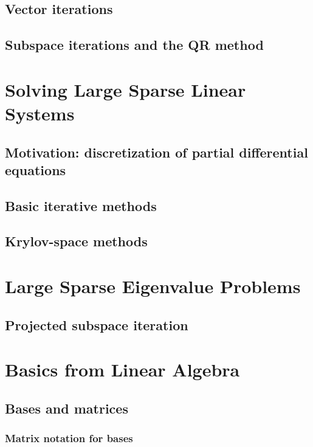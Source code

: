 \section{Vector iterations}


\section{Subspace iterations and the QR method}


%

\chapter{Solving Large Sparse Linear Systems}

\section{Motivation: discretization of partial differential equations}



\section{Basic iterative methods}


\section{Krylov-space methods}


\chapter{Large Sparse Eigenvalue Problems}
\section{Projected subspace iteration}



\appendix
\chapter{Basics from Linear Algebra}
\section{Bases and matrices}
\subsection{Matrix notation for bases}

